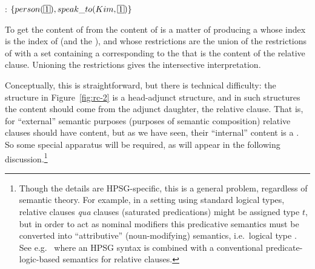 \documentclass[output=paper
                ,modfonts
                ,nonflat
	        ,collection
	        ,collectionchapter
	        ,collectiontoclongg
 	        ,biblatex
                ,babelshorthands
                ,newtxmath
                ,draftmode
                ,colorlinks, citecolor=brown
]{./langsci/langscibook}
\begin{document}
\begin{exe}
\ex\label{x:rc-38} : \ensuremath{\{person(\idx{1}),
        speak\_to(Kim,\idx{1})\}}
\end{exe}
To get the content of  from the content of  is a
matter of producing a  whose index is the index of  (and
the ), and whose restrictions are the union of the restrictions of
 with a set containing a  corresponding to the
 that is the content of the relative clause. Unioning the restrictions gives
the intersective interpretation.

Conceptually, this is straightforward, but there is technical difficulty: the structure in
Figure~\ref{fig:rc-2} is a head-adjunct structure, and in such structures the content should
come from the adjunct daughter, the relative clause. That is, for ``external'' semantic
purposes (purposes of semantic composition) relative clauses should have
 content, but as we have seen, their ``internal'' content is a
. So some special apparatus will be required, as will appear in the following
discussion.\footnote{Though the details are HPSG-specific, this is a general problem,
  regardless of semantic theory. For example, in a setting using standard logical types,
  relative clauses \emph{qua} clauses (saturated predications) might be assigned type $t$,
  but in order to act as nominal modifiers this predicative semantics must be converted
  into ``attributive'' (noun-modifying) semantics, i.e.\  logical type
  . See e.g.\ \cite[521--524]{Sag:10b} where an HPSG syntax is combined with a conventional
  predicate-logic-based semantics for relative clauses. }
\end{document}
